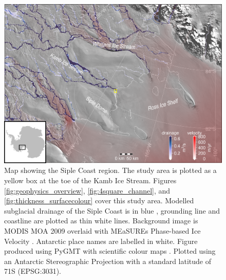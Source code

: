 \begin{figure}[!ht]
\centering
\includegraphics[width=1\textwidth]{chapters/2/fieldwork_location_small.png}
\caption[Fieldwork location]{Map showing the Siple Coast region. The study area is plotted as a yellow box at the toe of the Kamb Ice Stream. Figures \ref{fig:geophysics_overview}, \ref{fig:4square_channel}, and \ref{fig:thickness_surfacecolour} cover this study area. Modelled subglacial drainage of the Siple Coast is in blue \citep{le2009subglacial}, grounding line and coastline \citep{depoorter2013calving} are plotted as thin white lines. Background image is MODIS MOA 2009 \citep{haran2014modis} overlaid with MEaSUREs Phase-based Ice Velocity \citep{mouginot2019continent}. Antarctic place names are labelled in white. Figure produced using PyGMT \citep{uieda2021pygmt,wessel2019generic} with scientific colour maps \citep{crameri2018scientific}. Plotted using an Antarctic Stereographic Projection with a standard latitude of 71\textdegree S (EPSG:3031).}
\label{fig:fieldwork_location}
\end{figure} 

